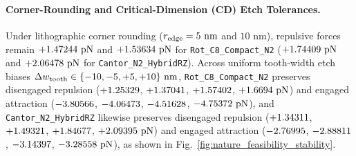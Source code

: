 \paragraph{Corner-Rounding and Critical-Dimension (CD) Etch Tolerances.}
Under lithographic corner rounding ($r_{\rm edge}=5\text{ nm}$ and $10\text{ nm}$), repulsive forces remain $+1.47244{}\text{ pN}$ and $+1.53634{}\text{ pN}$ for \texttt{Rot\_C8\_Compact\_N2} ($+1.74409{}\text{ pN}$ and $+2.06478{}\text{ pN}$ for \texttt{Cantor\_N2\_HybridRZ}).
Across uniform tooth-width etch biases $\Delta w_{\rm tooth} \in \{-10, -5, +5, +10\}\text{ nm}$, \texttt{Rot\_C8\_Compact\_N2} preserves disengaged repulsion ($+1.25329{}$, $+1.37041{}$, $+1.57402{}$, $+1.6694{}\text{ pN}$) and engaged attraction ($-3.80566{}$, $-4.06473{}$, $-4.51628{}$, $-4.75372{}\text{ pN}$), and \texttt{Cantor\_N2\_HybridRZ} likewise preserves disengaged repulsion ($+1.34311{}$, $+1.49321{}$, $+1.84677{}$, $+2.09395{}\text{ pN}$) and engaged attraction ($-2.76995{}$, $-2.88811{}$, $-3.14397{}$, $-3.28558{}\text{ pN}$), as shown in Fig.~\ref{fig:nature_feasibility_stability}.
